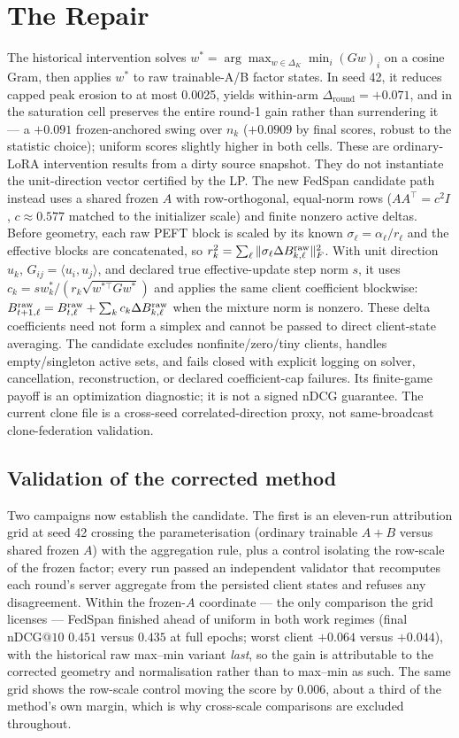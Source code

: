 \documentclass[sigconf,anonymous,review]{acmart}
\makeatletter
\newcommand{\ndcg}{\mathrm{nDCG@10}}
\newcommand{\RoundDrift}{\Delta_{\mathrm{round}}}
\makeatother
\begin{document}
\section{The Repair}\label{sec:repair}
The historical intervention solves $w^\ast=\arg\max_{w\in\Delta_K}\min_i(Gw)_i$ on a cosine Gram, then applies $w^\ast$ to raw trainable-A/B factor states. In seed 42, it reduces capped peak erosion to at most 0.0025, yields within-arm $\RoundDrift=+0.071$, and in the saturation cell preserves the entire round-1 gain rather than surrendering it --- a $+0.091$ frozen-anchored swing over $n_k$ ($+0.0909$ by final scores, robust to the statistic choice); uniform scores slightly higher in both cells. These are ordinary-LoRA intervention results from a dirty source snapshot. They do not instantiate the unit-direction vector certified by the LP. The new FedSpan candidate path instead uses a shared frozen $A$ with row-orthogonal, equal-norm rows ($AA^\top = c^2 I$, $c \approx 0.577$ matched to the initializer scale) and finite nonzero active deltas. Before geometry, each raw PEFT block is scaled by its known $\sigma_\ell=\alpha_\ell/r_\ell$ and the effective blocks are concatenated, so $r_k^2=\sum_\ell\|\sigma_\ell\Delta B^{\rm raw}_{k,\ell}\|_F^2$. With unit direction $u_k$, $G_{ij}=\langle u_i,u_j\rangle$, and declared true effective-update step norm $s$, it uses $c_k=s w_k^\ast/(r_k\sqrt{w^{\ast\top}Gw^\ast})$ and applies the same client coefficient blockwise: $B_{t+1,\ell}^{\rm raw}=B_{t,\ell}^{\rm raw}+\sum_kc_k\Delta B_{k,\ell}^{\rm raw}$ when the mixture norm is nonzero. These delta coefficients need not form a simplex and cannot be passed to direct client-state averaging. The candidate excludes nonfinite/zero/tiny clients, handles empty/singleton active sets, and fails closed with explicit logging on solver, cancellation, reconstruction, or declared coefficient-cap failures. Its finite-game payoff is an optimization diagnostic; it is not a signed nDCG guarantee. The current clone file is a cross-seed correlated-direction proxy, not same-broadcast clone-federation validation.

\subsection{Validation of the corrected method}
Two campaigns now establish the candidate. The first is an eleven-run attribution grid at seed 42 crossing the parameterisation (ordinary trainable $A{+}B$ versus shared frozen $A$) with the aggregation rule, plus a control isolating the row-scale of the frozen factor; every run passed an independent validator that recomputes each round's server aggregate from the persisted client states and refuses any disagreement. Within the frozen-$A$ coordinate --- the only comparison the grid licenses --- FedSpan finished ahead of uniform in both work regimes (final $\ndcg$ $0.451$ versus $0.435$ at full epochs; worst client $+0.064$ versus $+0.044$), with the historical raw max--min variant \emph{last}, so the gain is attributable to the corrected geometry and normalisation rather than to max--min as such. The same grid shows the row-scale control moving the score by $0.006$, about a third of the method's own margin, which is why cross-scale comparisons are excluded throughout.
\end{document}
